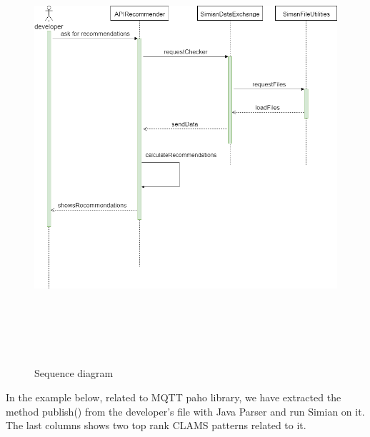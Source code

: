 \begin{figure}[!h]
\includegraphics[width=14cm,height=16cm,keepaspectratio]{images/Sequence.png}
\centering
\caption{Sequence diagram }
\label{fig:cmd}
\end{figure}


In the example below, related to MQTT paho library, we have extracted the method publish() from the developer's file with Java Parser and run Simian on it.  The last columns shows two top rank CLAMS patterns related to it.
\vspace{5mm}


